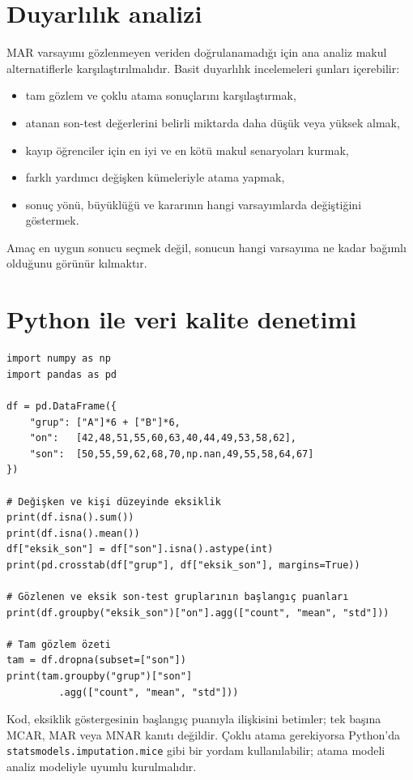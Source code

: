 \section{Duyarlılık analizi}

MAR varsayımı gözlenmeyen veriden doğrulanamadığı için ana analiz makul
alternatiflerle karşılaştırılmalıdır. Basit duyarlılık incelemeleri şunları
içerebilir:

\begin{itemize}
  \item tam gözlem ve çoklu atama sonuçlarını karşılaştırmak,
  \item atanan son-test değerlerini belirli miktarda daha düşük veya yüksek almak,
  \item kayıp öğrenciler için en iyi ve en kötü makul senaryoları kurmak,
  \item farklı yardımcı değişken kümeleriyle atama yapmak,
  \item sonuç yönü, büyüklüğü ve kararının hangi varsayımlarda değiştiğini göstermek.
\end{itemize}

Amaç en uygun sonucu seçmek değil, sonucun hangi varsayıma ne kadar bağımlı
olduğunu görünür kılmaktır.

\section{Python ile veri kalite denetimi}

\begin{lstlisting}[style=prismPython]
import numpy as np
import pandas as pd

df = pd.DataFrame({
    "grup": ["A"]*6 + ["B"]*6,
    "on":   [42,48,51,55,60,63,40,44,49,53,58,62],
    "son":  [50,55,59,62,68,70,np.nan,49,55,58,64,67]
})

# Değişken ve kişi düzeyinde eksiklik
print(df.isna().sum())
print(df.isna().mean())
df["eksik_son"] = df["son"].isna().astype(int)
print(pd.crosstab(df["grup"], df["eksik_son"], margins=True))

# Gözlenen ve eksik son-test gruplarının başlangıç puanları
print(df.groupby("eksik_son")["on"].agg(["count", "mean", "std"]))

# Tam gözlem özeti
tam = df.dropna(subset=["son"])
print(tam.groupby("grup")["son"]
         .agg(["count", "mean", "std"]))
\end{lstlisting}

Kod, eksiklik göstergesinin başlangıç puanıyla ilişkisini betimler; tek başına
MCAR, MAR veya MNAR kanıtı değildir. Çoklu atama gerekiyorsa Python'da
\texttt{statsmodels.imputation.mice} gibi bir yordam kullanılabilir; atama
modeli analiz modeliyle uyumlu kurulmalıdır.

